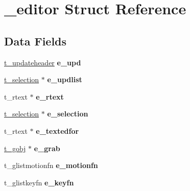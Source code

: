 \hypertarget{struct__editor}{\section{\-\_\-editor Struct Reference}
\label{struct__editor}
}
\subsection*{Data Fields}
\begin{DoxyCompactItemize}
\item 
\hypertarget{struct__editor_a38e7cda304883ebec575a8396f902476}{\hyperlink{struct__updateheader}{t\-\_\-updateheader} {\bfseries e\-\_\-upd}}\label{struct__editor_a38e7cda304883ebec575a8396f902476}

\item 
\hypertarget{struct__editor_ad68a2b52951d81b5a68a9d10bd04802a}{\hyperlink{struct__selection}{t\-\_\-selection} $\ast$ {\bfseries e\-\_\-updlist}}\label{struct__editor_ad68a2b52951d81b5a68a9d10bd04802a}

\item 
\hypertarget{struct__editor_a7b49cda496d6706db01beb4167b55397}{t\-\_\-rtext $\ast$ {\bfseries e\-\_\-rtext}}\label{struct__editor_a7b49cda496d6706db01beb4167b55397}

\item 
\hypertarget{struct__editor_aea38df08b4f979985f1ddf2bc72a60ff}{\hyperlink{struct__selection}{t\-\_\-selection} $\ast$ {\bfseries e\-\_\-selection}}\label{struct__editor_aea38df08b4f979985f1ddf2bc72a60ff}

\item 
\hypertarget{struct__editor_a1880e5af4effd7577cbde30d70a5e78c}{t\-\_\-rtext $\ast$ {\bfseries e\-\_\-textedfor}}\label{struct__editor_a1880e5af4effd7577cbde30d70a5e78c}

\item 
\hypertarget{struct__editor_a885afe9d12440d63f4fc14d638db66d6}{\hyperlink{struct__gobj}{t\-\_\-gobj} $\ast$ {\bfseries e\-\_\-grab}}\label{struct__editor_a885afe9d12440d63f4fc14d638db66d6}

\item 
\hypertarget{struct__editor_ad8de81a4cd70dead93f154fd1ff02c7f}{t\-\_\-glistmotionfn {\bfseries e\-\_\-motionfn}}\label{struct__editor_ad8de81a4cd70dead93f154fd1ff02c7f}

\item 
\hypertarget{struct__editor_acfc6ab81be14b3b5631f492cd705fd57}{t\-\_\-glistkeyfn {\bfseries e\-\_\-keyfn}}\label{struct__editor_acfc6ab81be14b3b5631f492cd705fd57}


\end{DoxyCompactItemize}
